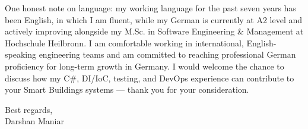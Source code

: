 \documentclass[letterpaper,11pt]{article}
\begin{document}
{\small One honest note on language: my working language for the past seven years has been English, in which I am fluent, while my German is currently at A2 level and actively improving alongside my M.Sc. in Software Engineering \& Management at Hochschule Heilbronn. I am comfortable working in international, English-speaking engineering teams and am committed to reaching professional German proficiency for long-term growth in Germany. I would welcome the chance to discuss how my C\#, DI/IoC, testing, and DevOps experience can contribute to your Smart Buildings systems — thank you for your consideration.}



\vspace{6pt}
{\small Best regards,\\}
{\small Darshan Maniar}
\end{document}
